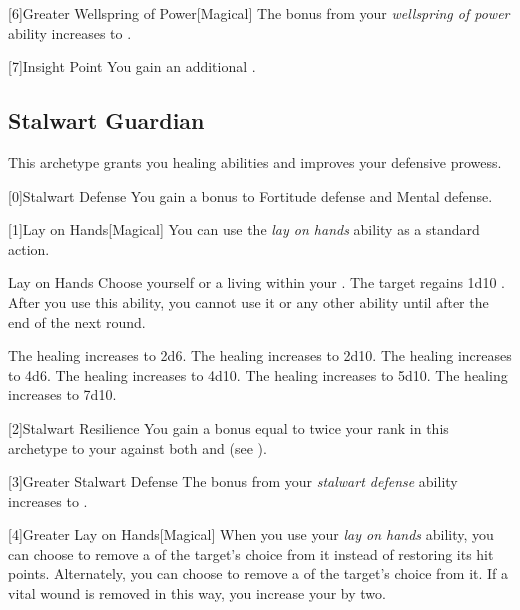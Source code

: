         [6]{Greater Wellspring of Power}[Magical]
        The bonus from your \textit{wellspring of power} ability increases to .

        [7]{Insight Point} You gain an additional .

    \newpage
    \subsection{Stalwart Guardian}
        This archetype grants you healing abilities and improves your defensive prowess.

        [0]{Stalwart Defense} You gain a  bonus to Fortitude defense and Mental defense.

        [1]{Lay on Hands}[Magical] You can use the \textit{lay on hands} ability as a standard action.
        \begin{instantability}{Lay on Hands}
            \rankline
            Choose yourself or a living  within your .
            The target regains 1d10 \add {} .
            After you use this ability, you cannot use it or any other  ability until after the end of the next round.

            \rankline
             The healing increases to 2d6.
             The healing increases to 2d10.
             The healing increases to 4d6.
             The healing increases to 4d10.
             The healing increases to 5d10.
             The healing increases to 7d10.
        \end{instantability}

        [2]{Stalwart Resilience} You gain a bonus equal to twice your rank in this archetype to your  against both  and  (see ).

        [3]{Greater Stalwart Defense} The bonus from your \textit{stalwart defense} ability increases to .

        [4]{Greater Lay on Hands}[Magical] When you use your \textit{lay on hands} ability, you can choose to remove a  of the target's choice from it instead of restoring its hit points.
        Alternately, you can choose to remove a  of the target's choice from it.
        If a vital wound is removed in this way, you increase your  by two.

